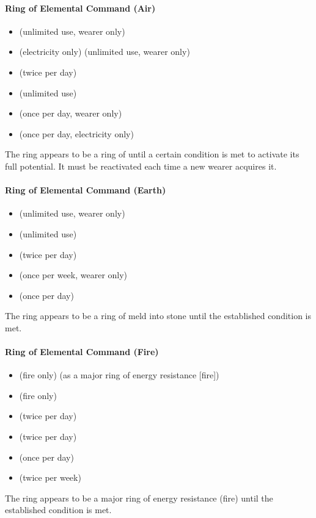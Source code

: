 \paragraph{Ring of Elemental Command (Air)}
\begin{itemize}
\item {} (unlimited use, wearer only)
\item {} (electricity only) (unlimited use, wearer only)
\item {} (twice per day)
\item {} (unlimited use)
\item {} (once per day, wearer only)
\item {} (once per day, electricity only)
\end{itemize}
The ring appears to be a ring of  until a certain condition is met to activate its full potential. It must be reactivated each time a new wearer acquires it.

\paragraph{Ring of Elemental Command (Earth)}
\begin{itemize}
\item {} (unlimited use, wearer only)
\item {} (unlimited use)
\item {} (twice per day)
\item {} (once per week, wearer only)
\item {} (once per day)
\end{itemize}
The ring appears to be a ring of meld into stone until the established condition is met.

\paragraph{Ring of Elemental Command (Fire)}
\begin{itemize}
\item {} (fire only) (as a major ring of energy resistance [fire])
\item {} (fire only)
\item {} (twice per day)
\item {} (twice per day)
\item {}  (once per day)
\item {} (twice per week)
\end{itemize}
The ring appears to be a major ring of energy resistance (fire) until the established condition is met.

